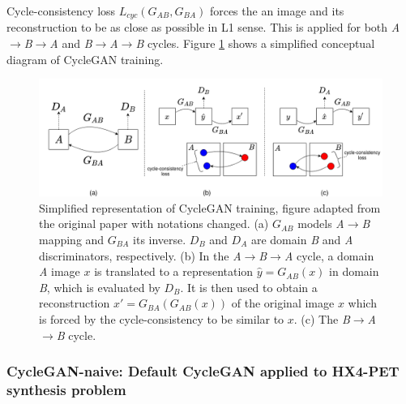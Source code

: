 Cycle-consistency loss $L_{cyc}(G_{AB}, G_{BA})$ forces the an image and its reconstruction to be as close as possible in L1 sense. This is applied for both \textit{A}$\rightarrow$\textit{B}$\rightarrow$\textit{A} and \textit{B}$\rightarrow$\textit{A}$\rightarrow$\textit{B} cycles.
Figure \ref{fig:cyclegan_concept} shows a simplified conceptual diagram of CycleGAN training.

\begin{figure}
    \centering
    \includegraphics[width=\textwidth]{figures/GANs/cyclegan_concept.png}
    \caption{Simplified representation of CycleGAN training, figure adapted from the original paper \cite{zhu2017unpaired} with notations changed. (a) $G_{AB}$ models \textit{A}$\rightarrow$\textit{B} mapping and $G_{BA}$ its inverse. $D_B$ and $D_A$ are domain \textit{B} and \textit{A} discriminators, respectively. (b) In the \textit{A}$\rightarrow$\textit{B}$\rightarrow$\textit{A} cycle, a domain \textit{A} image $x$ is translated to a representation \textit{$\hat{y} = G_{AB}(x)$} in domain \textit{B}, which is evaluated by $D_B$. It is then used to obtain a reconstruction $x' = G_{BA}(G_{AB}(x))$ of the original image $x$ which is forced by the cycle-consistency to be similar to $x$. (c) The \textit{B}$\rightarrow$\textit{A}$\rightarrow$\textit{B} cycle.}
    \label{fig:cyclegan_concept}
\end{figure}


\subsubsection{CycleGAN-naive: Default CycleGAN applied to HX4-PET synthesis problem}

